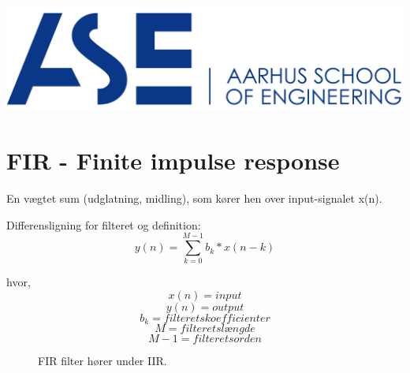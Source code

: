 \documentclass[12pt, letterpaper]{article}
\begin{document}
\begin{titlepage}

\includegraphics[scale=0.5]{billeder/au}\\ %
 

\vfill %


\end{titlepage}

\tableofcontents
\newpage

\newpage

\section{FIR - Finite impulse response}

En vægtet sum (udglatning, midling), som kører hen over input-signalet x(n). 

Differensligning for filteret og definition: 
$$ y(n)= \sum\limits_{k=0}^{M-1} b_k * x(n-k)$$

hvor, 
$$ x(n) = input $$
$$ y(n) = output $$
$$ b_k = filterets koefficienter $$ 
$$ M = filterets længde $$
$$ M-1 = filterets orden $$

\begin{figure}[!h]
           \begin{floatrow}
             		   			{\caption{FIR filter hører under IIR.}}
           \end{floatrow}
\end{figure}
\end{document}
